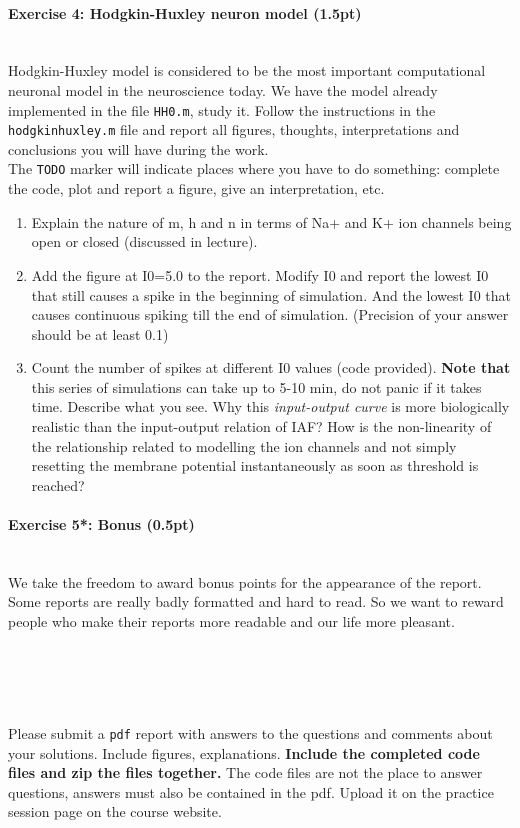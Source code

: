 \documentclass[a4paper,11pt]{article}
\newenvironment{exercise}[3]{\paragraph{Exercise #1: #2 (#3pt)}\ \\}{
\medskip}
\begin{document}
%
%
\begin{exercise}{4}{Hodgkin-Huxley neuron model}{1.5}

Hodgkin-Huxley model is considered to be the most important computational neuronal model in the neuroscience today. We have the model already implemented in the file \texttt{HH0.m}, study it. Follow the instructions in the \texttt{hodgkinhuxley.m} file and report all figures, thoughts, interpretations and conclusions you will have during the work.\\

The \texttt{TODO} marker will indicate places where you have to do something: complete the code, plot and report a figure, give an interpretation, etc.
\begin{enumerate}
\item Explain the nature of m, h and n in terms of Na+ and K+ ion channels being open or closed (discussed in lecture).
\item Add the figure at I0=5.0 to the report. Modify I0 and report the lowest I0 that still causes a spike in the beginning of simulation. And the lowest I0 that causes continuous spiking till the end of simulation. (Precision of your answer should be at least 0.1)
\item Count the number of spikes at different I0 values (code provided). \textbf{Note that} this series of simulations can take up to 5-10 min, do not panic if it takes time. Describe what you see. Why this \textit{input-output curve} is more biologically realistic than the input-output relation of IAF? How is the non-linearity of the relationship related to modelling the ion channels and not simply resetting the membrane potential instantaneously as soon as threshold is reached? 
\end{enumerate}
\end{exercise}


\begin{exercise}{5*}{Bonus}{0.5}
We take the freedom to award bonus points for the appearance of the report. Some reports are really badly formatted and hard to read. So we want to reward people who make their reports more readable and our life more pleasant.
\end{exercise}


\ \\
\ \\
\ \\
\ \\

Please submit a \texttt{pdf} report with answers to the questions and comments about your solutions. Include figures, explanations. \textbf{Include the completed code files and zip the files together.} The code files are not the place to answer questions, answers must also be contained in the pdf. Upload it on the practice session page on the course website.
\end{document}
